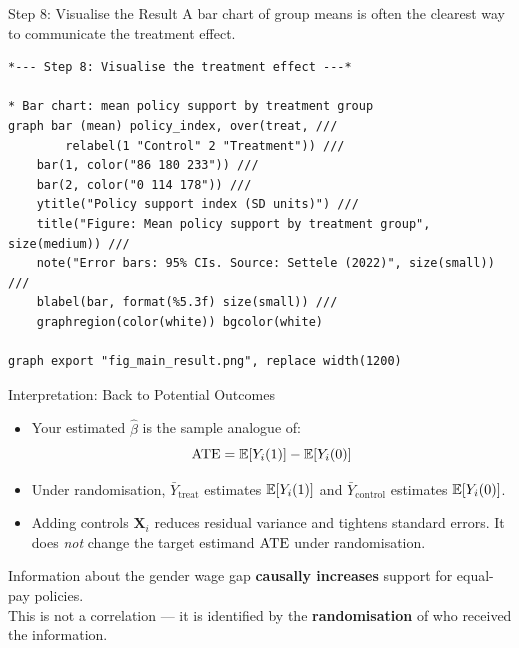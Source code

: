 \documentclass[aspectratio=169, 11pt]{beamer}
\begin{document}

\begin{frame}[fragile, t]{Step 8: Visualise the Result}
A bar chart of group means is often the clearest way to communicate the treatment effect.
\vspace{0.4em}
\begin{footnotesize}
\begin{verbatim}
*--- Step 8: Visualise the treatment effect ---*

* Bar chart: mean policy support by treatment group
graph bar (mean) policy_index, over(treat, ///
        relabel(1 "Control" 2 "Treatment")) ///
    bar(1, color("86 180 233")) ///
    bar(2, color("0 114 178")) ///
    ytitle("Policy support index (SD units)") ///
    title("Figure: Mean policy support by treatment group", size(medium)) ///
    note("Error bars: 95% CIs. Source: Settele (2022)", size(small)) ///
    blabel(bar, format(%5.3f) size(small)) ///
    graphregion(color(white)) bgcolor(white)

graph export "fig_main_result.png", replace width(1200)
\end{verbatim}
\end{footnotesize}
\end{frame}


\begin{frame}[t]{Interpretation: Back to Potential Outcomes}
\begin{itemize}
  \setlength\itemsep{0.5em}
  \item Your estimated $\hat\beta$ is the sample analogue of:
    \[
      \mathrm{ATE} = \mathbb{E}\!\left[Y_i(1)\right] - \mathbb{E}\!\left[Y_i(0)\right]
    \]
  \item Under randomisation, $\bar{Y}_{\mathrm{treat}}$ estimates $\mathbb{E}\!\left[Y_i(1)\right]$ and $\bar{Y}_{\mathrm{control}}$ estimates $\mathbb{E}\!\left[Y_i(0)\right]$.
  \item Adding controls $\mathbf{X}_i$ reduces residual variance and tightens standard errors.
    It does \emph{not} change the target estimand $\mathrm{ATE}$ under randomisation.
\end{itemize}
\vspace{0.3em}
\begin{intuitionbox}
Information about the gender wage gap \textbf{causally increases} support for equal-pay policies.\\[0.2em]
This is not a correlation — it is identified by the \textbf{randomisation} of who received the information.
\end{intuitionbox}
\end{frame}
\end{document}
